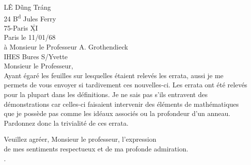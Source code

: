 LÊ Dũng Tráng\\
24 B\textsuperscript{d} Jules Ferry\\
75-Paris $\overline{\underline{\mathrm{XI}}}$\\

Paris le 11/01/68\\

à Monsieur le Professeur A. Grothendieck\\
IHES \qquad Bures S/Yvette\\

Monsieur le Professeur,\\

Ayant égaré les feuilles sur lesquelles étaient relevés les errata, aussi je me permets de vous envoyer si tardivement ces nouvelles-ci. Les errata ont été relevés pour la plupart dans les définitions. Je ne sais pas s'ils entravent des démonstrations car celles-ci faisaient intervenir des éléments de mathématiques que je  possède pas comme les idéaux associés ou la profondeur d'un anneau. Pardonnez donc la trivialité de ces errata.

Veuillez agréer, Monsieur le professeur, l'expression\\
de mes sentiments respectueux et de ma profonde admiration.\\

.\\



